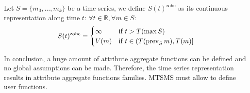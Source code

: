 Let $S=\{m_0,\ldots,m_k\}$ be a time series, we define
$S(t)^{\text{zohe}}$ as its continuous representation along time $t$:
$\forall t \in \mathbb{R}  ,\forall m \in S:$ 
\begin{equation}
 S(t)^{\text{zohe}} =  
\begin{cases}
  \infty & \text{if } t > T(\max S) \\%
  V(m) & \text{if }  t\in (T(\prev_S m),T(m)]
\end{cases}
\label{eq:zohe}
\end{equation}


In conclusion, a huge amount of attribute aggregate functions can be
defined and no global assumptions can be made.  Therefore, the time
series representation results in attribute aggregate functions
families.  MTSMS must allow to define
user functions.








